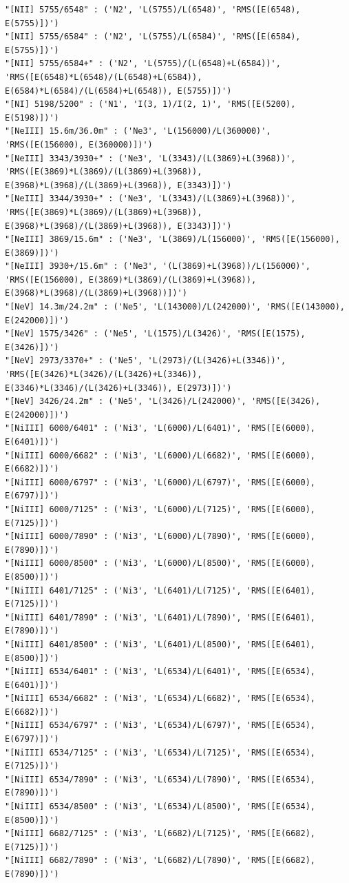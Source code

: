 \documentclass[11pt]{article}
\begin{document}
\begin{Verbatim}[commandchars=\\\{\}]
"[NII] 5755/6548" : ('N2', 'L(5755)/L(6548)', 'RMS([E(6548), E(5755)])')
"[NII] 5755/6584" : ('N2', 'L(5755)/L(6584)', 'RMS([E(6584), E(5755)])')
"[NII] 5755/6584+" : ('N2', 'L(5755)/(L(6548)+L(6584))', 'RMS([E(6548)*L(6548)/(L(6548)+L(6584)), E(6584)*L(6584)/(L(6584)+L(6548)), E(5755)])')
"[NI] 5198/5200" : ('N1', 'I(3, 1)/I(2, 1)', 'RMS([E(5200), E(5198)])')
"[NeIII] 15.6m/36.0m" : ('Ne3', 'L(156000)/L(360000)', 'RMS([E(156000), E(360000)])')
"[NeIII] 3343/3930+" : ('Ne3', 'L(3343)/(L(3869)+L(3968))', 'RMS([E(3869)*L(3869)/(L(3869)+L(3968)), E(3968)*L(3968)/(L(3869)+L(3968)), E(3343)])')
"[NeIII] 3344/3930+" : ('Ne3', 'L(3343)/(L(3869)+L(3968))', 'RMS([E(3869)*L(3869)/(L(3869)+L(3968)), E(3968)*L(3968)/(L(3869)+L(3968)), E(3343)])')
"[NeIII] 3869/15.6m" : ('Ne3', 'L(3869)/L(156000)', 'RMS([E(156000), E(3869)])')
"[NeIII] 3930+/15.6m" : ('Ne3', '(L(3869)+L(3968))/L(156000)', 'RMS([E(156000), E(3869)*L(3869)/(L(3869)+L(3968)), E(3968)*L(3968)/(L(3869)+L(3968))])')
"[NeV] 14.3m/24.2m" : ('Ne5', 'L(143000)/L(242000)', 'RMS([E(143000), E(242000)])')
"[NeV] 1575/3426" : ('Ne5', 'L(1575)/L(3426)', 'RMS([E(1575), E(3426)])')
"[NeV] 2973/3370+" : ('Ne5', 'L(2973)/(L(3426)+L(3346))', 'RMS([E(3426)*L(3426)/(L(3426)+L(3346)), E(3346)*L(3346)/(L(3426)+L(3346)), E(2973)])')
"[NeV] 3426/24.2m" : ('Ne5', 'L(3426)/L(242000)', 'RMS([E(3426), E(242000)])')
"[NiIII] 6000/6401" : ('Ni3', 'L(6000)/L(6401)', 'RMS([E(6000), E(6401)])')
"[NiIII] 6000/6682" : ('Ni3', 'L(6000)/L(6682)', 'RMS([E(6000), E(6682)])')
"[NiIII] 6000/6797" : ('Ni3', 'L(6000)/L(6797)', 'RMS([E(6000), E(6797)])')
"[NiIII] 6000/7125" : ('Ni3', 'L(6000)/L(7125)', 'RMS([E(6000), E(7125)])')
"[NiIII] 6000/7890" : ('Ni3', 'L(6000)/L(7890)', 'RMS([E(6000), E(7890)])')
"[NiIII] 6000/8500" : ('Ni3', 'L(6000)/L(8500)', 'RMS([E(6000), E(8500)])')
"[NiIII] 6401/7125" : ('Ni3', 'L(6401)/L(7125)', 'RMS([E(6401), E(7125)])')
"[NiIII] 6401/7890" : ('Ni3', 'L(6401)/L(7890)', 'RMS([E(6401), E(7890)])')
"[NiIII] 6401/8500" : ('Ni3', 'L(6401)/L(8500)', 'RMS([E(6401), E(8500)])')
"[NiIII] 6534/6401" : ('Ni3', 'L(6534)/L(6401)', 'RMS([E(6534), E(6401)])')
"[NiIII] 6534/6682" : ('Ni3', 'L(6534)/L(6682)', 'RMS([E(6534), E(6682)])')
"[NiIII] 6534/6797" : ('Ni3', 'L(6534)/L(6797)', 'RMS([E(6534), E(6797)])')
"[NiIII] 6534/7125" : ('Ni3', 'L(6534)/L(7125)', 'RMS([E(6534), E(7125)])')
"[NiIII] 6534/7890" : ('Ni3', 'L(6534)/L(7890)', 'RMS([E(6534), E(7890)])')
"[NiIII] 6534/8500" : ('Ni3', 'L(6534)/L(8500)', 'RMS([E(6534), E(8500)])')
"[NiIII] 6682/7125" : ('Ni3', 'L(6682)/L(7125)', 'RMS([E(6682), E(7125)])')
"[NiIII] 6682/7890" : ('Ni3', 'L(6682)/L(7890)', 'RMS([E(6682), E(7890)])')

\end{Verbatim}
\end{document}
